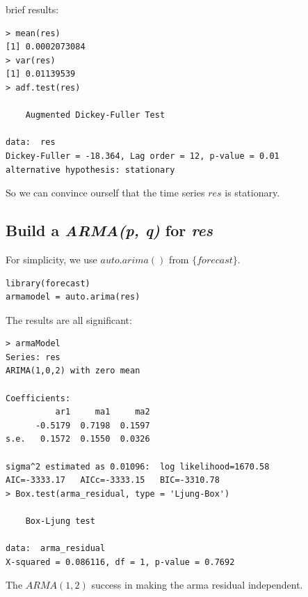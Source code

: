 \documentclass[a4paper, 11pt]{article}
\begin{document}
\indent brief results:
\begin{verbatim}
> mean(res)
[1] 0.0002073084
> var(res)
[1] 0.01139539
> adf.test(res)

	Augmented Dickey-Fuller Test

data:  res
Dickey-Fuller = -18.364, Lag order = 12, p-value = 0.01
alternative hypothesis: stationary
\end{verbatim}
\indent So we can convince ourself that the time series $res$ is stationary.

\subsection{Build a \textit{ARMA(p, q)} for \textit{res}}
For simplicity, we use $auto.arima()$ from $\{forecast\}$.
\begin{verbatim}
library(forecast)
armamodel = auto.arima(res)
\end{verbatim}
\indent The results are all significant:

\begin{verbatim}
> armaModel
Series: res 
ARIMA(1,0,2) with zero mean     

Coefficients:
          ar1     ma1     ma2
      -0.5179  0.7198  0.1597
s.e.   0.1572  0.1550  0.0326

sigma^2 estimated as 0.01096:  log likelihood=1670.58
AIC=-3333.17   AICc=-3333.15   BIC=-3310.78
> Box.test(arma_residual, type = 'Ljung-Box')

	Box-Ljung test

data:  arma_residual
X-squared = 0.086116, df = 1, p-value = 0.7692
\end{verbatim}

\indent The $ARMA(1, 2)$ success in making the arma residual independent. 
\end{document}
